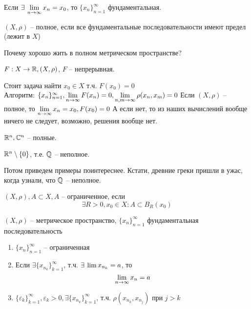 \documentclass[document]{subfiles}
\begin{document}
\begin{remark}
    Если $\exists \liml_{n \to \infty} x_n = x_0$, то $\{x_n\}^\infty_{n=1}$ фундаментальная.
\end{remark}


\begin{definition}
    $(X, \rho)$ -- полное, если все фундаментальные последовательности имеют предел (лежит в $X$)
\end{definition}

Почему хорошо жить в полном метрическом пространстве?

\begin{remark}
    $F: X \rightarrow \mathbb{R}, (X,\rho)$, $F$ -- непрерывная.

    Стоит задача найти $x_0 \in X$ т.ч. $F(x_0) = 0$ \\
    Алгоритм: $\{x_n\}^\infty_{n=1}, \lim\limits_{n \to \infty} F(x_n) = 0, \lim\limits_{n, m \to \infty} \rho(x_n, x_m) = 0$
    Если $(X, \rho)$ -- полное, то $\lim\limits_{n \to \infty} x_n = x_0, F(x_0) = 0$
    А если нет, то из наших вычислений вообще ничего не следует, возможно, решения вообще нет.
\end{remark}

\begin{example}
    $\mathbb{R}^n, \mathbb{C}^n$ -- полные.
\end{example}
    
\begin{example}
    $\mathbb{R}^n \setminus \{0\}$, т.е.  $\mathbb{Q}$ -- неполное.
\end{example}

Потом приведем примеры поинтереснее. Кстати, древние греки пришли в ужас, когда узнали, что $\mathbb{Q}$ -- неполное.

\begin{definition}
    $(X,\rho), A \subset X, A $ -- ограниченное, если 
    \[ \exists R > 0, x_0 \in X : A \subset B_R(x_0) \]
\end{definition}

\begin{theorem}
    $(X,\rho)$ -- метрическое пространство, $\{x_n\}^\infty_{n=1}$ фундаментальная последовательность
    \begin{enumerate}
        \item $\{x_n\}^\infty_{n=1}$ -- ограниченная
        \item Если $\exists \{x_{n_k}\}^\infty_{k=1}$, т.ч. $\exists \liml x_{n_k} = a$, то
        \[ \lim\limits_{n \to \infty} x_n = a \] 
        \item $\{ \varepsilon_k \}_{k=1}^\infty, \varepsilon_k > 0, \exists \{x_{n_k}\}^\infty_{k=1}$, т.ч. $\rho(x_{n_k}, x_{n_j})$ при $j > k$
    \end{enumerate}
\end{theorem}
\end{document}
